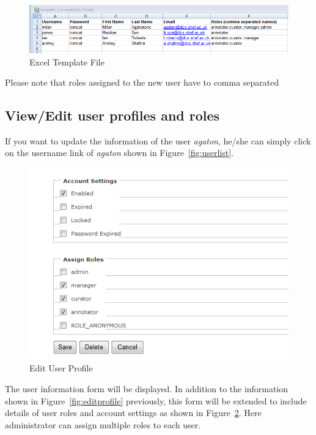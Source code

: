 \begin{figure}[hb!]
\centering
\includegraphics[scale=0.4]{bulkuseruploadxlstemplate}
\caption{Excel Template File}
\label{fig:bulkuseruploadxlstemplate}
\end{figure}

Please note that roles assigned to the new user have to comma separated

\subsection{View/Edit user profiles and roles}
If you want to update the information of the user
\emph{agaton}, he/she can simply click on the username link of
\emph{agaton} shown in Figure~\ref{fig:userlist}.

\begin{figure}[hb!]
\centering
\includegraphics[scale=0.4]{userprofile}
\caption{Edit User Profile}
\label{fig:userprofile}
\end{figure}

The user information form will be displayed. In addition to the information
shown in Figure~\ref{fig:editprofile} previously, this form will be extended
to include details of user roles and account settings as shown in
Figure~\ref{fig:userprofile}. Here administrator can assign multiple
roles to each user.

